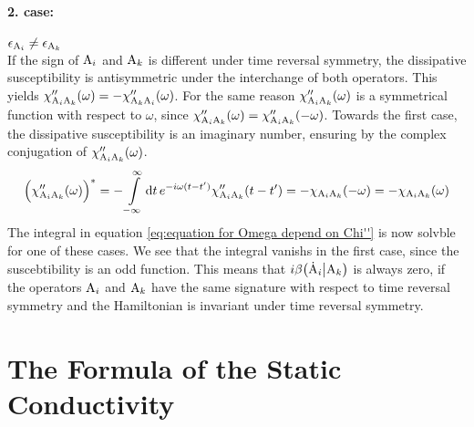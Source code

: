 \paragraph{2. case:} $\epsilon_{\mathrm{A}_{i}} \neq \epsilon_{\mathrm{A}_{k}}$\\
%
If the sign of $\mathrm{A}_{i}$ and $\mathrm{A}_{k}$ is different under time reversal symmetry, the dissipative susceptibility is antisymmetric under the interchange of both operators.
This yields $\chi''_{\mathrm{A}_{i} \mathrm{A}_{k}}(\omega) = -\chi''_{\mathrm{A}_{k} \mathrm{A}_{i}}(\omega)$.
For the same reason $\chi''_{\mathrm{A}_{i} \mathrm{A}_{k}}(\omega)$ is a symmetrical function with respect to $\omega$, since $\chi''_{\mathrm{A}_{i} \mathrm{A}_{k}}(\omega) = \chi''_{\mathrm{A}_{i} \mathrm{A}_{k}}(-\omega)$.
Towards the first case, the dissipative susceptibility is an imaginary number, ensuring by the complex conjugation of $\chi''_{\mathrm{A}_{i} \mathrm{A}_{k}}(\omega)$.
%
\begin{align}
	\Big(\chi''_{\mathrm{A}_{i} \mathrm{A}_{k}}(\omega)\Big)^{*} = -\int\limits_{-\infty}^{\infty} \dd{t} e^{-i\omega(t-t')} \chi''_{\mathrm{A}_{i} \mathrm{A}_{k}}(t-t') = -\chi_{\mathrm{A}_{i} \mathrm{A}_{k}}(-\omega) = -\chi_{\mathrm{A}_{i} \mathrm{A}_{k}}(\omega)
\end{align}
%
The integral in equation \eqref{eq:equation for Omega depend on Chi''} is now solvble for one of these cases.
We see that the integral vanishs in the first case, since the suscebtibility is an odd function.
This means that $i \beta \big({\dot{\mathrm{A}}_{i}}\big|{\mathrm{A}_{k}}\big)$ is always zero, if the operators $\mathrm{A}_{i}$ and $\mathrm{A}_{k}$ have the same signature with respect to time reversal symmetry and the Hamiltonian is invariant under time reversal symmetry.

%
%
\section{The Formula of the Static Conductivity}
\label{sec:formula static conductivity}
%
%




































